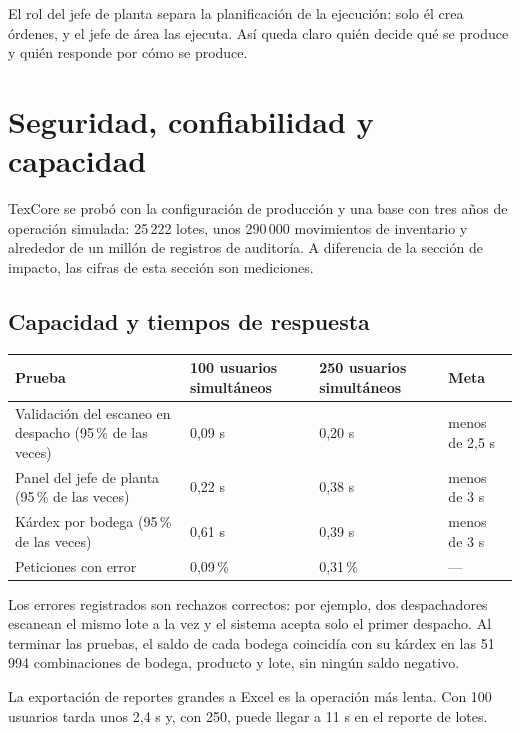 \documentclass[11pt,a4paper]{article}
\newcommand{\encabezado}{\rowcolor{fondo}}
\begin{document}
El rol del jefe de planta separa la planificación de la ejecución: solo él crea órdenes, y el jefe de área las ejecuta. Así queda claro quién decide qué se produce y quién responde por cómo se produce.

\section{Seguridad, confiabilidad y capacidad}

TexCore se probó con la configuración de producción y una base con tres años de operación simulada: 25\,222 lotes, unos 290\,000 movimientos de inventario y alrededor de un millón de registros de auditoría. A diferencia de la sección de impacto, las cifras de esta sección son mediciones.

\subsection{Capacidad y tiempos de respuesta}

\begin{center}
\begin{tabularx}{\textwidth}{LP{2.6cm}P{2.6cm}P{2.3cm}}
\toprule
\encabezado \textbf{Prueba} & \textbf{100 usuarios simultáneos} & \textbf{250 usuarios simultáneos} & \textbf{Meta} \\
\midrule
Validación del escaneo en despacho (95\,\% de las veces) & 0,09 s & 0,20 s & menos de 2,5 s \\
Panel del jefe de planta (95\,\% de las veces) & 0,22 s & 0,38 s & menos de 3 s \\
Kárdex por bodega (95\,\% de las veces) & 0,61 s & 0,39 s & menos de 3 s \\
Peticiones con error & 0,09\,\% & 0,31\,\% & — \\
\bottomrule
\end{tabularx}
\end{center}

Los errores registrados son rechazos correctos: por ejemplo, dos despachadores escanean el mismo lote a la vez y el sistema acepta solo el primer despacho. Al terminar las pruebas, el saldo de cada bodega coincidía con su kárdex en las 51\,994 combinaciones de bodega, producto y lote, sin ningún saldo negativo.

La exportación de reportes grandes a Excel es la operación más lenta. Con 100 usuarios tarda unos 2,4 s y, con 250, puede llegar a 11 s en el reporte de lotes.
\end{document}
